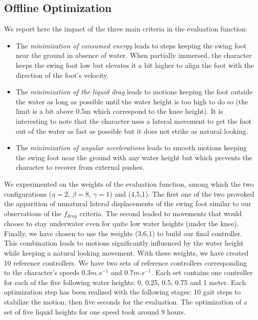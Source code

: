 \documentclass[runningheads,a4paper,10pt]{llncs}
\begin{document}
\subsection{Offline Optimization}
We report here the impact of the three main criteria in the evaluation function:
\begin{itemize}
\item\begin{minipage}[t]{\linewidth}{
The \textit{minimization of consumed energy} leads to steps keeping the swing foot near the ground in absence of water. When partially immersed, the character keeps the swing foot low but elevates it a bit higher to align the foot with the direction of the foot's velocity.}
\end{minipage}
\item\begin{minipage}[t]{\linewidth}{
The \textit{minimization of the liquid drag} leads to motions keeping the foot outside the water as long as possible until the water height is too high to do so (the limit is a bit above 0.5m which correspond to the knee height). It is interesting to note that the character uses a lateral movement to get the foot out of the water as fast as possible but it does not strike as natural looking.}
\end{minipage}
\item\begin{minipage}[t]{\linewidth}{
The \textit{minimization of angular accelerations} leads to smooth motions keeping the swing foot near the ground with any water height but which prevents the character to recover from external pushes.}
\end{minipage}
\end{itemize}
We experimented on the weights of the evaluation function, among which the two configurations ($\eta=2$, $\beta=8$, $\gamma=1$) and (4,5,1). The first one of the two provoked the apparition of unnatural lateral displacements of the swing foot similar to our observations of the $f_{drag}$ criteria. The second leaded to movements that would choose to stay underwater even for quite low water heights (under the knee). Finally, we have chosen to use the weights (3,6,1) to build our final controller. This combination leads to motions significantly influenced by the water height while keeping a natural looking movement. With these weights, we have created 10 reference controllers. We have two sets of reference controllers corresponding to the character's speeds $0.3m.s^{-1}$ and $0.7m.s^{-1}$. Each set contains one controller for each of the five following water heights: 0, 0.25, 0.5, 0.75 and 1 meter. Each optimization step has been realized with the following stages: 10 gait steps to stabilize the motion, then five seconds for the evaluation. The optimization of a set of five liquid heights for one speed took around 9 hours.
\end{document}
